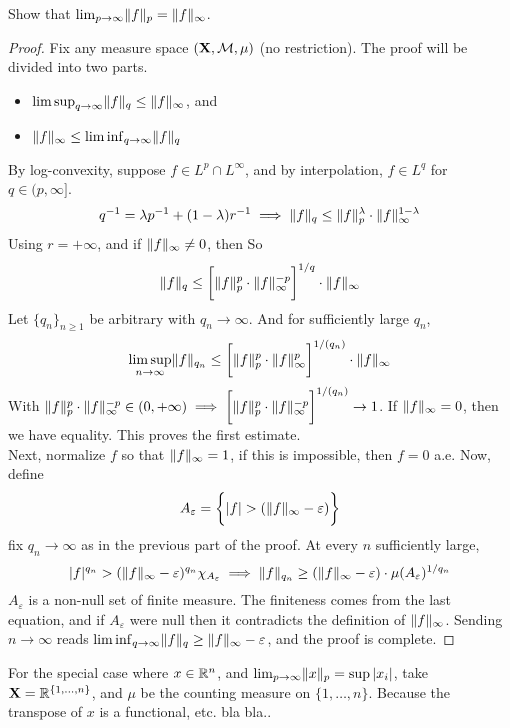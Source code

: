 \documentclass[../../main.tex]{subfiles}
\begin{document}
\providecommand{\xx}{\mathbf{X}}
\begin{wts}
    Show that $\lim_{p\to\infty}\lVert {f} \rVert_p = \lVert {f} \rVert_\infty$.
\end{wts}
\begin{proof}
    Fix any measure space $(\xx, \mcal, \mu)$ (no restriction). The proof will be divided into two parts.
    \begin{itemize}
        \item $\limsup_{q\to\infty} \lVert {f} \rVert_q\leq \lVert {f} \rVert_\infty$, and 
        \item $\lVert {f} \rVert_\infty\leq\liminf_{q\to\infty}\lVert {f} \rVert_q$
    \end{itemize}
    By log-convexity, suppose $f\in L^p\cap L^\infty$, and by interpolation, $f\in L^q$ for $q\in (p,\infty]$. 
    \begin{equation}\label{log-convex expression}
        q^{-1} = \lambda p^{-1} + (1-\lambda)r^{-1}\implies \lVert {f} \rVert_q\leq\lVert {f} \rVert_p^\lambda\cdot\lVert {f} \rVert_\infty^{1-\lambda}
    \end{equation}
    Using $r = +\infty$, and if $\lVert {f} \rVert_\infty\neq 0$, then So
    \begin{align*}
        \lVert {f} \rVert_q\leq\biggl[\lVert {f} \rVert_p^p\cdot\lVert {f} \rVert_\infty^{-p} \biggr]^{1/q}\cdot\lVert {f} \rVert_\infty
    \end{align*}
    Let $\{q_n\}_{n\geq 1}$ be arbitrary with $q_n\to\infty$. And for sufficiently large $q_n$,
    \[
        \limsup_{n\to\infty}\lVert {f} \rVert_{q_n}\leq\biggl[\lVert {f} \rVert_p^p\cdot\lVert {f} \rVert_\infty^p\biggr]^{1/(q_n)}\cdot\lVert {f} \rVert_\infty
    \]
    With $\lVert {f} \rVert_p^p\cdot\lVert {f} \rVert_\infty^{-p}\in(0,+\infty)\implies \biggl[\lVert {f} \rVert_p^p\cdot\lVert {f} \rVert_\infty^{-p}\biggr]^{1/(q_n)}\to 1$. If $\lVert {f} \rVert_\infty = 0$, then we have equality. This proves the first estimate.\\

    Next, normalize $f$ so that $\lVert {f} \rVert_\infty = 1$, if this is impossible, then $f = 0$ a.e. Now, define
    \[
        A_{\varepsilon} = \biggl\{{|f| > (\lVert {f} \rVert_\infty - \varepsilon)}\biggr\}
    \]
    fix $q_n\to\infty$ as in the previous part of the proof. At every $n$ sufficiently large,
    \[
        |f|^{q_n} > (\lVert {f} \rVert_\infty - \varepsilon)^{q_n} \chi_{A_{\varepsilon}}\implies\lVert {f} \rVert_{q_n}\geq (\lVert {f} \rVert_\infty - \varepsilon)\cdot\mu(A_\varepsilon)^{1/{q_n}}
    \]
    $A_\varepsilon$ is a non-null set of finite measure. The finiteness comes from the last equation, and if $A_\varepsilon$ were null then it contradicts the definition of $\lVert {f} \rVert_\infty$. Sending $n\to\infty$ reads $\liminf_{q\to\infty} \lVert {f} \rVert_q\geq \lVert {f} \rVert_\infty - \varepsilon$, and the proof is complete.
\end{proof}
\begin{corollary}
    For the special case where $x\in{\mathbb{R}^n}$, and $\lim_{p\to\infty}\lVert {x} \rVert_p=\sup |x_i|$, take $\xx = \real^{\{1,\ldots, n\}}$, and $\mu$ be the counting measure on $\{1,\ldots, n\}$. Because the transpose of $x$ is a functional, etc. bla bla..
\end{corollary}
\end{document}
